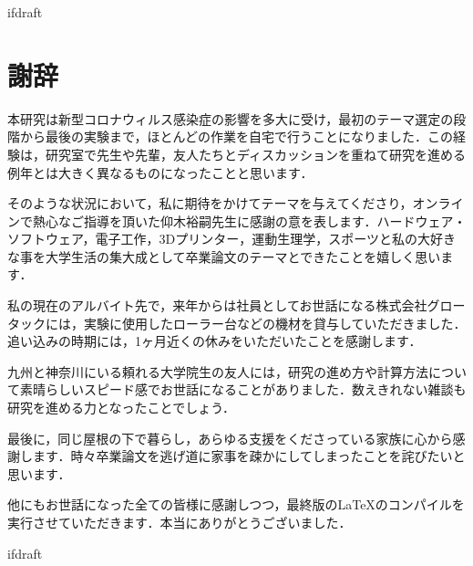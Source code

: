 \expandafter\ifx\csname ifdraft\endcsname\relax
 
\fi

\section*{謝辞}

本研究は新型コロナウィルス感染症の影響を多大に受け，最初のテーマ選定の段階から最後の実験まで，ほとんどの作業を自宅で行うことになりました．この経験は，研究室で先生や先輩，友人たちとディスカッションを重ねて研究を進める例年とは大きく異なるものになったことと思います．

そのような状況において，私に期待をかけてテーマを与えてくださり，オンラインで熱心なご指導を頂いた仰木裕嗣先生に感謝の意を表します．ハードウェア・ソフトウェア，電子工作，3Dプリンター，運動生理学，スポーツと私の大好きな事を大学生活の集大成として卒業論文のテーマとできたことを嬉しく思います．

私の現在のアルバイト先で，来年からは社員としてお世話になる株式会社グロータックには，実験に使用したローラー台などの機材を貸与していただきました．追い込みの時期には，1ヶ月近くの休みをいただいたことを感謝します．

九州と神奈川にいる頼れる大学院生の友人には，研究の進め方や計算方法について素晴らしいスピード感でお世話になることがありました．数えきれない雑談も研究を進める力となったことでしょう．

最後に，同じ屋根の下で暮らし，あらゆる支援をくださっている家族に心から感謝します．時々卒業論文を逃げ道に家事を疎かにしてしまったことを詫びたいと思います．

他にもお世話になった全ての皆様に感謝しつつ，最終版のLaTeXのコンパイルを実行させていただきます．本当にありがとうございました．

\expandafter\ifx\csname ifdraft\endcsname\relax
  
\fi
